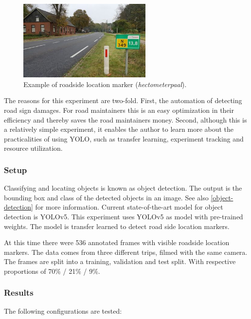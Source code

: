 \begin{figure}[ht]
\begin{center}
\includegraphics[height=4cm,keepaspectratio]{images/5_multimodal_fusion/example_hectometer.jpeg}
\end{center}
\caption{Example of roadside location marker (\textit{hectometerpaal}).}
\end{figure}


The reasons for this experiment are two-fold. First, the automation of detecting road sign damages. For road maintainers this is an easy optimization in their efficiency and thereby saves the road maintainers money. Second, although this is a relatively simple experiment, it enables the author to learn more about the practicalities of using YOLO, such as transfer learning, experiment tracking and resource utilization.


\subsubsection{Setup}
Classifying and locating objects is known as object detection. The output is the bounding box and class of the detected objects in an image. See also \ref{object-detection} for more information. Current state-of-the-art model for object detection is YOLOv5. This experiment uses YOLOv5 as model with pre-trained weights. The model is transfer learned to detect road side location markers. 

At this time there were 536 annotated frames with visible roadside location markers. The data comes from three different trips, filmed with the same camera. The frames are split into a training, validation and test split. With respective proportions of 70\% / 21\% / 9\%. 


\subsubsection{Results}
The following configurations are tested:


